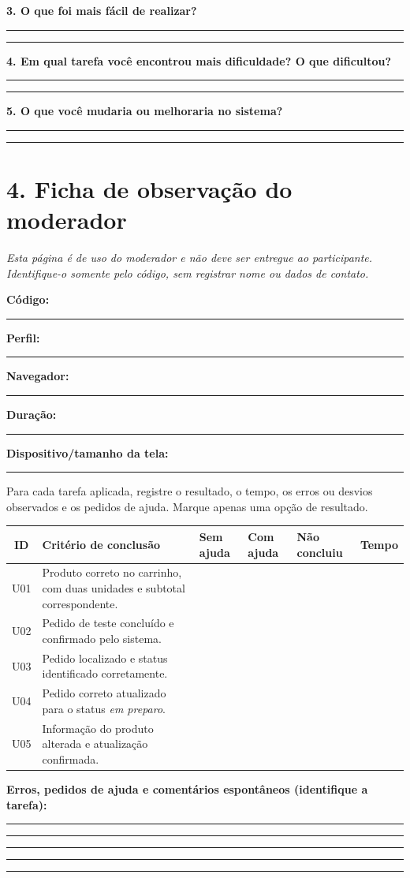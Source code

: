 \documentclass[12pt,a4paper]{article}
\newcommand{\caixa}{\fbox{\rule{0pt}{1.1ex}\rule{1.1ex}{0pt}}}
\newcommand{\linharesposta}{\par\vspace{0.45cm}\hrule\vspace{0.45cm}}
\begin{document}
\textbf{3. O que foi mais fácil de realizar?}
\linharesposta\linharesposta

\textbf{4. Em qual tarefa você encontrou mais dificuldade? O que dificultou?}
\linharesposta\linharesposta

\textbf{5. O que você mudaria ou melhoraria no sistema?}
\linharesposta\linharesposta

\newpage
\section*{4. Ficha de observação do moderador}

\textit{Esta página é de uso do moderador e não deve ser entregue ao participante. Identifique-o somente pelo código, sem registrar nome ou dados de contato.}

\textbf{Código:} \rule{2.5cm}{0.4pt}\quad
\textbf{Perfil:} \rule{3cm}{0.4pt}

\textbf{Navegador:} \rule{4cm}{0.4pt}\hfill
\textbf{Duração:} \rule{3cm}{0.4pt}

\textbf{Dispositivo/tamanho da tela:} \rule{10cm}{0.4pt}

Para cada tarefa aplicada, registre o resultado, o tempo, os erros ou desvios observados e os pedidos de ajuda. Marque apenas uma opção de resultado.

\scriptsize
\begin{tabularx}{\textwidth}{|c|X|C{1.25cm}|C{1.25cm}|C{1.4cm}|C{1.2cm}|}
\hline
\textbf{ID} & \textbf{Critério de conclusão} & \textbf{Sem ajuda} & \textbf{Com ajuda} & \textbf{Não concluiu} & \textbf{Tempo} \\
\hline
U01 & Produto correto no carrinho, com duas unidades e subtotal correspondente. & \caixa & \caixa & \caixa & \\
\hline
U02 & Pedido de teste concluído e confirmado pelo sistema. & \caixa & \caixa & \caixa & \\
\hline
U03 & Pedido localizado e status identificado corretamente. & \caixa & \caixa & \caixa & \\
\hline
U04 & Pedido correto atualizado para o status \textit{em preparo}. & \caixa & \caixa & \caixa & \\
\hline
U05 & Informação do produto alterada e atualização confirmada. & \caixa & \caixa & \caixa & \\
\hline
\end{tabularx}
\normalsize

\textbf{Erros, pedidos de ajuda e comentários espontâneos (identifique a tarefa):}
\linharesposta\linharesposta\linharesposta\linharesposta\linharesposta
\end{document}
